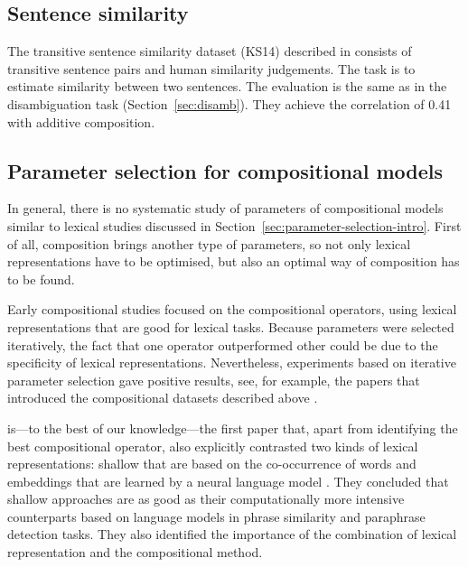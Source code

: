 \subsection{Sentence similarity}
\label{sec:sentence-similarity}

The transitive sentence similarity dataset (KS14) described in  consists of transitive sentence pairs and human similarity judgements. The task is to estimate similarity between two sentences. The evaluation is the same as in the disambiguation task (Section~\ref{sec:disamb}). They achieve the correlation of 0.41 with additive composition.

\subsection{Parameter selection for compositional models}
\label{sec:comp-parameter-selection}

In general, there is no systematic study of parameters of compositional models similar to lexical studies discussed in Section~\ref{sec:parameter-selection-intro}. First of all, composition brings another type of parameters, so not only lexical representations have to be optimised, but also an optimal way of composition has to be found.

Early compositional studies focused on the compositional operators, using lexical representations that are good for lexical tasks. Because parameters were selected iteratively, the fact that one operator outperformed other could be due to the specificity of lexical representations. Nevertheless, experiments based on iterative parameter selection gave positive results, see, for example, the papers that introduced the compositional datasets described above \citet{Grefenstette:2011:ETV:2140490.2140497,kartsaklis-sadrzadeh-pulman:2013:CoNLL-2013}.

\citet{blacoe2012comparison} is---to the best of our knowledge---the first paper that, apart from identifying the best compositional operator, also  explicitly contrasted two kinds of lexical representations: shallow that are based on the co-occurrence of words and embeddings that are learned by a neural language model \cite{bengio2006,Collobert:2008:UAN:1390156.1390177}. They concluded that shallow approaches are as good as their computationally more intensive counterparts based on language models in phrase similarity and paraphrase detection tasks. They also identified the importance of the combination of lexical representation and the compositional method.

